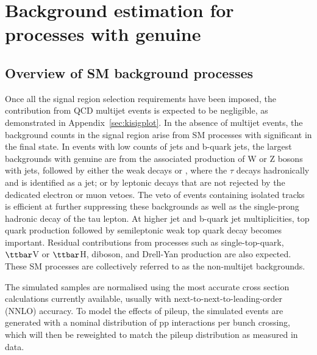 
\section{Background estimation for processes with genuine \met}
\label{sec:backgroundmet}
\subsection{Overview of SM background processes}

Once all the signal region selection requirements have been imposed,
the contribution from QCD multijet events is expected to be
negligible, as demonstrated in Appendix~\ref{sec:kisigplot}. In the absence of
multijet events, the background counts in the signal region arise from
SM processes with significant \met in the final state. In events with
low counts of jets and b-quark jets, the largest backgrounds with
genuine \met are from the associated production of W or Z bosons with
jets, followed by either the weak decays \znunu or \wtaunu, where the
$\tau$ decays hadronically and is identified as a jet; or by leptonic
decays that are not rejected by the dedicated electron or muon
vetoes. The veto of events containing isolated tracks is efficient at
further suppressing these backgrounds as well as the single-prong
hadronic decay of the tau lepton. At higher jet and b-quark jet
multiplicities, top quark production followed by semileptonic weak top
quark decay becomes important.  Residual contributions from processes
such as single-top-quark, $\ttbar$V or $\ttbar$H, diboson, and
Drell-Yan production are also expected. These SM processes are
collectively referred to as the non-multijet backgrounds.

The simulated samples are normalised using the most accurate cross
section calculations currently available, usually with
next-to-next-to-leading-order (NNLO) accuracy. To model the effects of
pileup, the simulated events are generated with a nominal distribution
of pp interactions per bunch crossing, which will then be reweighted
to match the pileup distribution as measured in data. 

